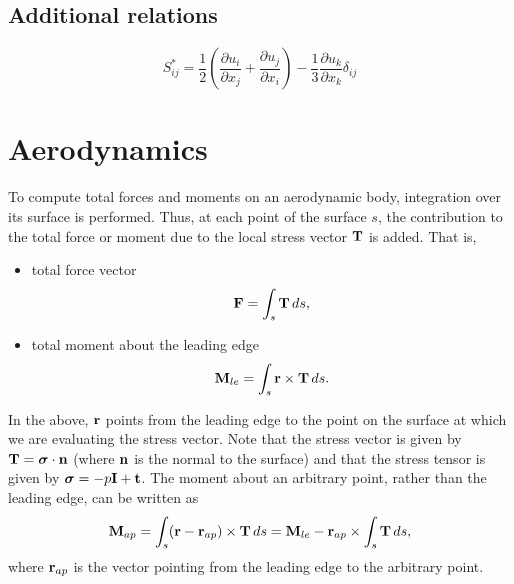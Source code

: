 \documentclass[oneside,a4paper,11pt]{report}
\begin{document}
\section{Additional relations}
\begin{equation}
    S^*_{ij} = \frac{1}{2} \left ( \frac{\partial u_i}{\partial x_j} + \frac{\partial u_j}{\partial x_i} \right ) - \frac{1}{3} \frac{\partial u_k}{\partial x_k} \delta_{ij}
\end{equation}

%
\chapter{Aerodynamics}
%
To compute total forces and moments on an aerodynamic body, integration over its surface is performed. Thus, at each point of the surface $s$, the contribution to the total force or moment due to the local stress vector $\mathbf{T}$ is added. That is,
\begin{itemize}
    \item total force vector
    \begin{equation}
        \mathbf{F} = \int_s \mathbf{T} \, ds,
    \end{equation}
    \item total moment about the leading edge 
    \begin{equation}
        \mathbf{M}_{le} = \int_s \mathbf{r} \times \mathbf{T} \, ds.
    \end{equation}
\end{itemize}
In the above, $\mathbf{r}$ points from the leading edge to the point on the surface at which we are evaluating the stress vector. Note that the stress vector is given by $\mathbf{T} = \boldsymbol{\sigma} \cdot \mathbf{n}$ (where $\mathbf{n}$ is the normal to the surface) and that the stress tensor is given by $\boldsymbol{\sigma} = -p \mathbf{I} + \mathbf{t}$. The moment about an arbitrary point, rather than the leading edge, can be written as
\begin{equation}
\label{eq:moment_shift}
    \mathbf{M}_{ap} = \int_s (\mathbf{r} - \mathbf{r}_{ap} ) \times \mathbf{T} \, ds = \mathbf{M}_{le} - \mathbf{r}_{ap} \times \int_s  \mathbf{T} \, ds,
\end{equation}
where $\mathbf{r}_{ap}$ is the vector pointing from the leading edge to the arbitrary point. 
\end{document}
